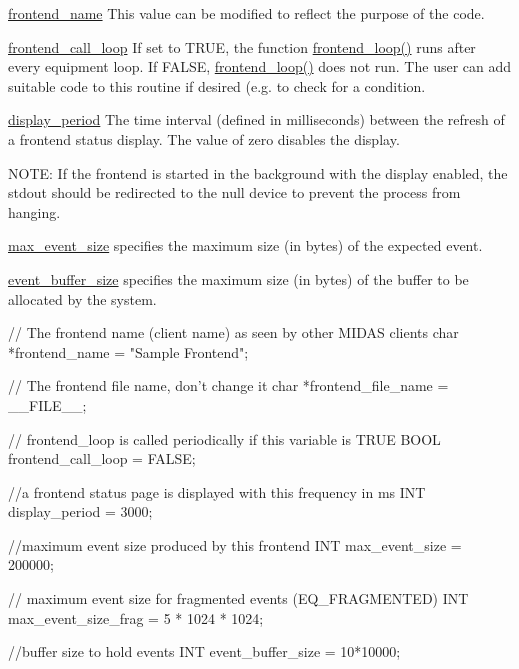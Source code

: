 \begin{DoxyItemize}
\item \hyperlink{frontend_8c_ac1f0c6df66e35778b61c611107501ec4}{frontend\_\-name}   This value can be modified to reflect the purpose of the code.  
\item \hyperlink{frontend_8c_a0215c0a842a0e97fe65c7ef5fb7633a5}{frontend\_\-call\_\-loop}   If set to TRUE, the function \hyperlink{mfe_8c_ad902740ed5577f2f940454359ec1df1c}{frontend\_\-loop()} runs after every equipment loop. If FALSE, \hyperlink{mfe_8c_ad902740ed5577f2f940454359ec1df1c}{frontend\_\-loop()} does not run. The user can add suitable code to this routine if desired (e.g. to check for a condition.  
\item \hyperlink{frontend_8c_ab9cdcefda91459091b0ed33011d0d18c}{display\_\-period}   The time interval (defined in milliseconds) between the refresh of a frontend status display. The value of zero disables the display. \par
 NOTE: If the frontend is started in the background with the display enabled, the stdout should be redirected to the null device to prevent the process from hanging.  
\item \hyperlink{frontend_8c_a13adb6e6b95ca2a62bbfe2453d71a1cd}{max\_\-event\_\-size}   specifies the maximum size (in bytes) of the expected event.  
\item \hyperlink{frontend_8c_a4411d7db6f901c968b946ed659d202f6}{event\_\-buffer\_\-size}   specifies the maximum size (in bytes) of the buffer to be allocated by the system.  
\end{DoxyItemize}


\begin{DoxyCode}
    // The frontend name (client name) as seen by other MIDAS clients
    char *frontend_name = "Sample Frontend";

    // The frontend file name, don't change it
    char *frontend_file_name = __FILE__;

    // frontend_loop is called periodically if this variable is TRUE
    BOOL frontend_call_loop = FALSE;

    //a frontend status page is displayed with this frequency in ms
    INT display_period = 3000;

    //maximum event size produced by this frontend
    INT max_event_size = 200000;

    // maximum event size for fragmented events (EQ_FRAGMENTED) 
    INT max_event_size_frag = 5 * 1024 * 1024;

    //buffer size to hold events
    INT event_buffer_size = 10*10000;
\end{DoxyCode}
 \par


